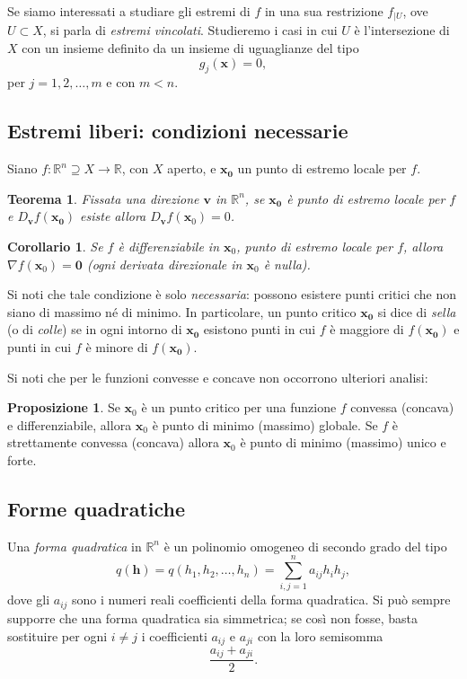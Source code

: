 \documentclass[a4paper]{book}
\numberwithin{equation}{section}
\theoremstyle{plain}
\newtheorem{teor}{Teorema}[section]
\newtheorem{cor}{Corollario}[section]
\theoremstyle{definition}
\newtheorem{prop}{Proposizione}[section]
\theoremstyle{remark}
\renewcommand{\vec}{\boldsymbol}
\theoremstyle{example}
\begin{document}
	Se siamo interessati a studiare gli estremi di $f$ in una sua restrizione $f_{|U}$, ove $U \subset X$, si parla di \emph{estremi vincolati}. Studieremo i casi in cui $U$ è l'intersezione di $X$ con un insieme definito da un insieme di uguaglianze del tipo
	\begin{equation*}
		g_j(\vec{x}) = 0,
	\end{equation*}
	per $j = 1, 2, \dots, m$ e con $m < n$.

	\subsection{Estremi liberi: condizioni necessarie}
	Siano $f \colon \mathbb{R}^n \supseteq X \to \mathbb{R}$, con $X$ aperto, e $\vec{x_0}$ un punto di estremo locale per $f$.
	\begin{teor}
		Fissata una direzione $\vec{v}$ in $\mathbb{R}^n$, se $\vec{x_0}$ è punto di estremo locale per $f$ e $D_{\vec{v}}f(\vec{x_0})$ esiste allora $D_{\vec{v}}f(\vec{x}_0) = 0$.
	\end{teor}

	\begin{cor}
		Se $f$ è differenziabile in $\vec{x}_0$, punto di estremo locale per $f$, allora $\nabla f(\vec{x}_0) = \vec{0}$ (ogni derivata direzionale in $\vec{x}_0$ è nulla).
	\end{cor}

	Si noti che tale condizione è solo \emph{necessaria}: possono esistere punti critici che non siano di massimo né di minimo. In particolare, un punto critico $\vec{x_0}$ si dice di \emph{sella} (o di \emph{colle}) se in ogni intorno di $\vec{x_0}$ esistono punti in cui $f$ è maggiore di $f(\vec{x_0})$ e punti in cui $f$ è minore di $f(\vec{x_0})$.

	Si noti che per le funzioni convesse e concave non occorrono ulteriori analisi:
	\begin{prop}
		Se $\vec{x}_0$ è un punto critico per una funzione $f$ convessa (concava) e differenziabile, allora $\vec{x}_0$ è punto di minimo (massimo) globale. Se $f$ è strettamente convessa (concava) allora $\vec{x}_0$ è punto di minimo (massimo) unico e forte.
	\end{prop}

	\subsection{Forme quadratiche}
	\label{subsec:formequadratiche}
	Una \emph{forma quadratica} in $\mathbb{R}^n$ è un polinomio omogeneo di secondo grado del tipo
	\begin{equation}
		\label{eqn:formaquadratica}
		q(\vec{h}) = q(h_1, h_2, \dots, h_n) = \sum_{i,j=1}^na_{ij}h_ih_j,
	\end{equation}
	dove gli $a_{ij}$ sono i numeri reali coefficienti della forma quadratica. Si può sempre supporre che una forma quadratica sia simmetrica; se così non fosse, basta sostituire per ogni $i \ne j$ i coefficienti $a_{ij}$ e $a_{ji}$ con la loro semisomma
	\begin{equation*}
		\frac{a_{ij} + a_{ji}}{2}.
	\end{equation*}
\end{document}
